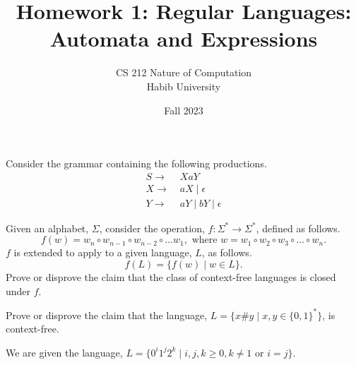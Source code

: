 \documentclass[addpoints]{exam}
\title{Homework 1: Regular Languages: Automata and Expressions}
\author{CS 212 Nature of Computation\\Habib University}
\date{Fall 2023}
\begin{document}
\maketitle

\begin{questions}
  
\question Consider the grammar containing the following productions.
\begin{align*} 
  S \to &\; XaY\\
  X \to &\; aX \mid \epsilon\\
  Y \to &\; aY \mid bY \mid \epsilon
\end{align*}


\question[5] Given an alphabet, $\Sigma$, consider the operation, $f:\Sigma^*\to\Sigma^*$, defined as follows.
  \[
f(w) = w_n\circ w_{n-1}\circ w_{n-2}\circ\ldots w_{1}, \text{ where } w = w_1\circ w_2\circ w_3\circ\ldots\circ w_n.
  \]
  $f$ is extended to apply to a given language, $L$, as follows.
  \[
    f(L) = \{ f(w) \mid w\in L \}.
  \]
  Prove or disprove the claim that the class of context-free languages is closed under $f$.
  
\question[5] Prove or disprove the claim that the language, $L=\{ x\#y \mid x,y\in\{0,1\}^*\}$, is context-free.

\question We are given the language, $L = \{0^i1^j2^k \mid i,j,k \geq 0, k \neq 1 \text{ or } i = j\}$.
\end{questions}
\end{document}
